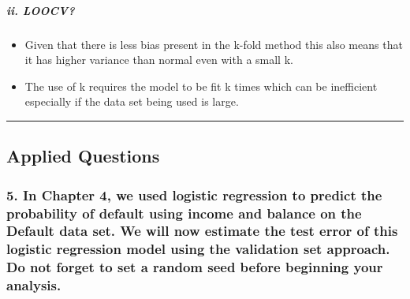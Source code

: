 \documentclass[
]{article}
\newenvironment{Shaded}{\begin{snugshade}}{\end{snugshade}}
\newcommand{\DecValTok}[1]{\textcolor[rgb]{0.00,0.00,0.81}{#1}}
\newcommand{\FunctionTok}[1]{\textcolor[rgb]{0.13,0.29,0.53}{\textbf{#1}}}
\newcommand{\NormalTok}[1]{#1}
\newcommand{\OtherTok}[1]{\textcolor[rgb]{0.56,0.35,0.01}{#1}}
\newcommand{\SpecialCharTok}[1]{\textcolor[rgb]{0.81,0.36,0.00}{\textbf{#1}}}
\newcommand{\StringTok}[1]{\textcolor[rgb]{0.31,0.60,0.02}{#1}}
\providecommand{\tightlist}{%
  \setlength{\itemsep}{0pt}\setlength{\parskip}{0pt}}
\begin{document}
\subparagraph{ii. LOOCV?}\label{ii.-loocv}

\begin{itemize}
\tightlist
\item
  Given that there is less bias present in the k-fold method this also
  means that it has higher variance than normal even with a small k.
\item
  The use of k requires the model to be fit k times which can be
  inefficient especially if the data set being used is large.
\end{itemize}

\begin{center}\rule{0.5\linewidth}{0.5pt}\end{center}

\subsection{Applied Questions}\label{applied-questions}

\subsubsection{5. In Chapter 4, we used logistic regression to predict
the probability of default using income and balance on the Default data
set. We will now estimate the test error of this logistic regression
model using the validation set approach. Do not forget to set a random
seed before beginning your
analysis.}\label{in-chapter-4-we-used-logistic-regression-to-predict-the-probability-of-default-using-income-and-balance-on-the-default-data-set.-we-will-now-estimate-the-test-error-of-this-logistic-regression-model-using-the-validation-set-approach.-do-not-forget-to-set-a-random-seed-before-beginning-your-analysis.}

\begin{Shaded}
\end{Shaded}
\end{document}
